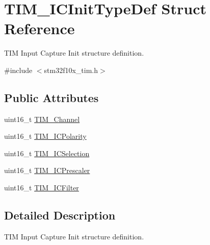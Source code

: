 \hypertarget{structTIM__ICInitTypeDef}{
\section{TIM\_\-ICInitTypeDef Struct Reference}
\label{structTIM__ICInitTypeDef}
}


TIM Input Capture Init structure definition.  




{\ttfamily \#include $<$stm32f10x\_\-tim.h$>$}

\subsection*{Public Attributes}
\begin{DoxyCompactItemize}
\item 
uint16\_\-t \hyperlink{structTIM__ICInitTypeDef_ab9404ee3d95aaa7a478ed99562c736d2}{TIM\_\-Channel}
\item 
uint16\_\-t \hyperlink{structTIM__ICInitTypeDef_a234c284efc36c0cc15a2ed0fb4435557}{TIM\_\-ICPolarity}
\item 
uint16\_\-t \hyperlink{structTIM__ICInitTypeDef_a00b9a72e895a43dc18c69c96a149f080}{TIM\_\-ICSelection}
\item 
uint16\_\-t \hyperlink{structTIM__ICInitTypeDef_ac61c7fc999ace295ac81b304cabd61e0}{TIM\_\-ICPrescaler}
\item 
uint16\_\-t \hyperlink{structTIM__ICInitTypeDef_a72539caa6e965e4fa89e3b21b188cf26}{TIM\_\-ICFilter}
\end{DoxyCompactItemize}


\subsection{Detailed Description}
TIM Input Capture Init structure definition. 

